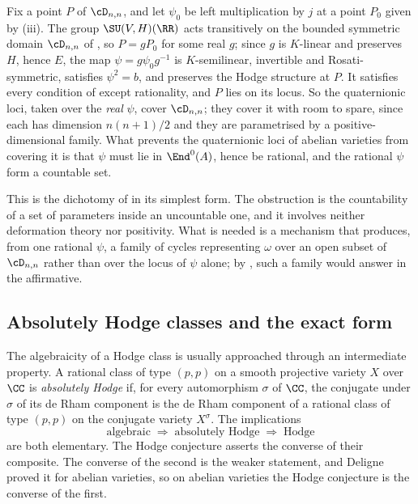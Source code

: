 \begin{remark}%
\label{rem:onlyrational}
Fix a point $P$ of $\cD_{n,n}$, and let $\psi_{0}$ be left multiplication by
$j$ at a point $P_{0}$ given by (iii). The group
$\SU(V,H)(\RR)$ acts transitively on the bounded symmetric domain $\cD_{n,n}$
of , so $P=gP_{0}$ for some real $g$; since $g$ is
$K$-linear and preserves $H$, hence $E$, the map
$\psi=g\psi_{0}g^{-1}$ is $K$-semilinear, invertible and Rosati-symmetric,
satisfies $\psi^{2}=b$, and preserves the Hodge structure at $P$. It
satisfies every condition of  except rationality, and
$P$ lies on its locus. So the quaternionic loci, taken over the \emph{real}
$\psi$, cover $\cD_{n,n}$; they cover it with room to spare, since each has
dimension $n(n+1)/2$ and they are parametrised by a positive-dimensional
family. What prevents the quaternionic loci of abelian varieties from
covering it is that $\psi$ must lie in $\End^{0}(A)$, hence be rational, and
the rational $\psi$ form a countable set.

This is the dichotomy of  in its simplest form. The
obstruction is the countability of a set of parameters inside an uncountable
one, and it involves neither deformation theory nor positivity. What is
needed is a mechanism that produces, from one rational $\psi$, a family of
cycles representing $\omega$ over an open subset of $\cD_{n,n}$ rather than
over the locus of $\psi$ alone; by , such a family
would answer  in the affirmative.
\end{remark}

\subsection{Absolutely Hodge classes and the exact form}\label{ssec:exactform}

The algebraicity of a Hodge class is usually approached through an
intermediate property. A rational class of type $(p,p)$ on a smooth
projective variety $X$ over $\CC$ is \emph{absolutely Hodge} if, for every
automorphism $\sigma$ of $\CC$, the conjugate under $\sigma$ of its de Rham
component is the de Rham component of a rational class of type $(p,p)$ on the
conjugate variety $X^{\sigma}$. The implications
\begin{equation}\label{eq:threechain}
  \text{algebraic}
  \;\Longrightarrow\;
  \text{absolutely Hodge}
  \;\Longrightarrow\;
  \text{Hodge}
\end{equation}
are both elementary. The Hodge conjecture asserts the converse of their
composite. The converse of the second is the weaker statement, and Deligne
proved it for abelian varieties, so on abelian varieties the Hodge conjecture
is the converse of the first.

